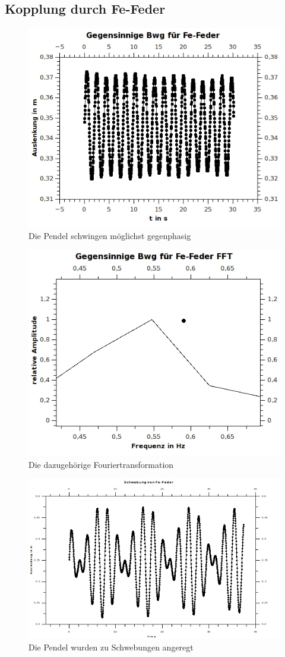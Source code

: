\clearpage

\subsection{Kopplung durch Fe-Feder}

\begin{figure}[h!]
\centering
\includegraphics[width=0.65\linewidth]{../Messungen/graphen/gg-Bwg-Fe}
\caption{Die Pendel schwingen möglichst gegenphasig}
\label{fig:gg-Bwg-Fe}
\end{figure}

\begin{figure}[h!]
\centering
\includegraphics[width=0.7\linewidth]{../Messungen/graphen/gg-Bwg-Fe-FFT}
\caption{Die dazugehörige Fouriertransformation}
\label{fig:gg-Bwg-Fe-FFT}
\end{figure}

\clearpage

\begin{figure}[h!]
\centering
\includegraphics[width=0.7\linewidth]{../Messungen/graphen/schwebung-Fe}
\caption{Die Pendel wurden zu Schwebungen angeregt}
\label{fig:schwebung-Fe}
\end{figure}

